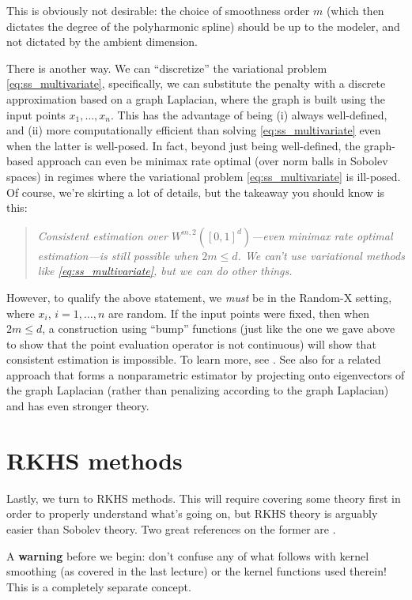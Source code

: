 \documentclass{article}
\begin{document}
This is obviously not desirable: the choice of smoothness order $m$ (which then
dictates the degree of the polyharmonic spline) should be up to the modeler, and
not dictated by the ambient dimension.

There is another way. We can ``discretize'' the variational problem
\eqref{eq:ss_multivariate}, specifically, we can substitute the penalty with a
discrete approximation based on a graph Laplacian, where the graph is built 
using the input points $x_1,\dots,x_n$. This has the advantage of being (i)
always well-defined, and (ii) more computationally efficient than solving
\eqref{eq:ss_multivariate} even when the latter is well-posed. In fact, beyond
just being well-defined, the graph-based approach can even be minimax rate
optimal (over norm balls in Sobolev spaces) in regimes where the variational
problem \eqref{eq:ss_multivariate} is ill-posed. Of course, we're skirting a lot
of details, but the takeaway you should know is this:  
\begin{quote}
\centering\it
Consistent estimation over $W^{m,2}([0,1]^d)$---even minimax rate optimal
estimation---is still possible when $2m \leq d$. We can't use variational
methods like \eqref{eq:ss_multivariate}, but we can do other things.
\end{quote}
However, to qualify the above statement, we \emph{must} be in the Random-X
setting, where $x_i$, $i=1,\dots,n$ are random. If the input points were fixed,
then when $2m \leq d$, a construction using ``bump'' functions (just like the
one we gave above to show that the point evaluation operator is not continuous)
will show that consistent estimation is impossible. To learn more, see 
\citet{green2021minimax}. See also \citet{green2023minimax} for a related
approach that forms a nonparametric estimator by projecting onto eigenvectors of 
the graph Laplacian (rather than penalizing according to the graph Laplacian)
and has even stronger theory.  

\section{RKHS methods}

Lastly, we turn to RKHS methods. This will require covering some theory first in
order to properly understand what's going on, but RKHS theory is arguably easier
than Sobolev theory. Two great references on the former are
\citet{scholkopf2002learning, christmann2008support}.  

A \textbf{warning} before we begin: don't confuse any of what follows with
kernel smoothing (as covered in the last lecture) or the kernel functions used
therein! This is a completely separate concept. 
\end{document}
